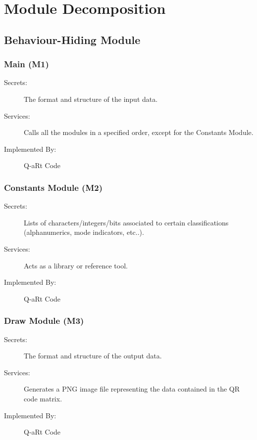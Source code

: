 \documentclass[12pt, titlepage]{article}
\begin{document}
\section{Module Decomposition} \label{SecMD}


\subsection{Behaviour-Hiding Module}

\subsubsection{Main (M1)}

\begin{description}
\item[Secrets:] The format and structure of the input data.
\item[Services:] Calls all the modules in a specified order, except for the Constants Module.
\item[Implemented By:] Q-aRt Code
\end{description}

\subsubsection{Constants Module (M2)}

\begin{description}
\item[Secrets:] Lists of characters/integers/bits associated to certain classifications (alphanumerics, mode indicators, etc..).
\item[Services:] Acts as a library or reference tool.
\item[Implemented By:] Q-aRt Code
\end{description}

\subsubsection{Draw Module (M3)}

\begin{description}
\item[Secrets:] The format and structure of the output data.
\item[Services:] Generates a PNG image file representing the data contained in the QR code matrix.
\item[Implemented By:] Q-aRt Code
\end{description}
\end{document}
